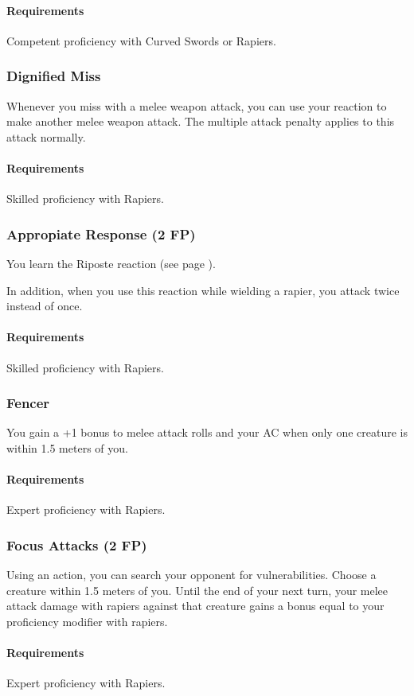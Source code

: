     \paragraph{Requirements} Competent proficiency with Curved Swords or Rapiers.
\subsubsection{Dignified Miss} \label{feat::dignifiedmiss}
    Whenever you miss with a melee weapon attack, you can use your reaction to make another melee weapon attack.
    The multiple attack penalty applies to this attack normally.
    \paragraph{Requirements} Skilled proficiency with Rapiers.
\subsubsection{Appropiate Response (2 FP)} \label{feat::appropiateresponse}
    You learn the Riposte reaction (see page \pageref{act::riposte}).

    In addition, when you use this reaction while wielding a rapier, you attack twice instead of once.
    \paragraph{Requirements} Skilled proficiency with Rapiers.
\subsubsection{Fencer} \label{feat::fencer}
    You gain a +1 bonus to melee attack rolls and your AC when only one creature is within 1.5 meters of you.
    \paragraph{Requirements} Expert proficiency with Rapiers.
\subsubsection{Focus Attacks (2 FP)} \label{feat::focusattacks}
    Using an action, you can search your opponent for vulnerabilities.
    Choose a creature within 1.5 meters of you.
    Until the end of your next turn, your melee attack damage with rapiers against that creature gains a bonus equal to your proficiency modifier with rapiers.
    \paragraph{Requirements} Expert proficiency with Rapiers.
